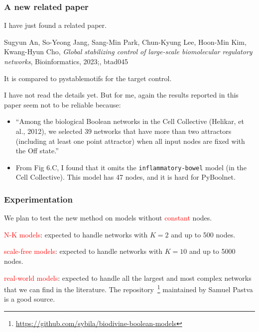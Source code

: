\documentclass{beamer}              %
\newcommand{\red}[1]{\textcolor{red}{#1}}
\begin{document}
\begin{frame}
\frametitle{A new related paper}

I have just found a related paper.

Sugyun An, So-Yeong Jang, Sang-Min Park, Chun-Kyung Lee, Hoon-Min Kim, Kwang-Hyun Cho, \emph{Global stabilizing control of large-scale biomolecular regulatory networks}, Bioinformatics, 2023;, btad045

\hspace{0cm}

It is compared to pystablemotifs for the target control.

\hspace{0cm}

I have not read the details yet. But for me, again the results reported in this paper seem not to be reliable because:

\begin{itemize}
  \item ``Among the biological Boolean networks in the Cell Collective (Helikar, et al., 2012), we selected 39 networks that have more than two attractors (including at least one point attractor) when all input nodes are fixed with the Off state.''
  \item From Fig 6.C, I found that it omits the \texttt{inflammatory-bowel} model (in the Cell Collective). This model has 47 nodes, and it is hard for PyBoolnet.
\end{itemize}

\end{frame}


\begin{frame}
\frametitle{Experimentation}

We plan to test the new method on models without \red{constant} nodes.

\hspace{0.8cm}

\red{N-K models}: expected to handle networks with \(K = 2\) and up to 500 nodes.

\hspace{0.8cm}

\red{scale-free models}: expected to handle networks with \(K = 10\) and up to 5000 nodes.

\hspace{0.8cm}

\red{real-world models}: expected to handle all the largest and most complex networks that we can find in the literature. The repository~\footnote{\url{https://github.com/sybila/biodivine-boolean-models}} maintained by Samuel Pastva is a good source.

\end{frame}
\end{document}
